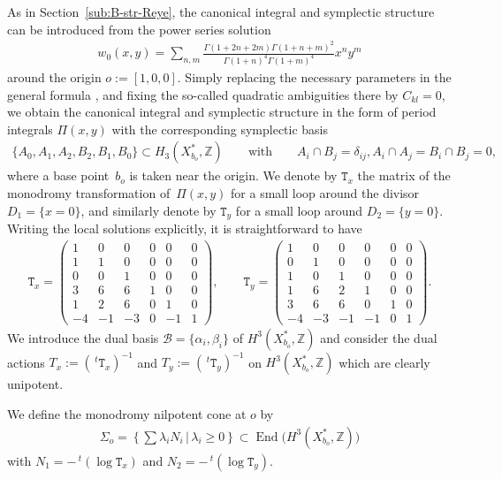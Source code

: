 \documentclass[pdftex]{sigma}
\numberwithin{equation}{section}
\begin{document}
As in Section~\ref{sub:B-str-Reye}, the canonical integral and symplectic structure can be introduced from the power series solution
\begin{gather*}
w_{0}(x,y)=\sum_{n,m}\frac{\Gamma(1+2n+2m)\Gamma(1+n+m)^{2}}{\Gamma(1+n)^{4}\Gamma(1+m)^{4}}x^{n}y^{m}
\end{gather*}
around the origin $o:=[1,0,0]$. Simply replacing the necessary parameters in the general formula \cite[Section~6.3.1]{HTcmp}, and fixing the so-called quadratic ambiguities there by $C_{kl}=0$, we obtain the canonical integral and symplectic structure in the form of period integrals $\Pi(x,y)$ with the corresponding symplectic basis
\begin{gather*}
\{ A_{0},A_{1},A_{2},B_{2},B_{1},B_{0}\} \subset H_{3}(X_{b_{o}}^{*},\mathbb{Z})\qquad \text{with}\qquad A_{i}\cap B_{j}=\delta_{ij},A_{i}\cap A_{j}=B_{i}\cap B_{j}=0,
\end{gather*}
where a base point~$b_{o}$ is taken near the origin. We denote by $\mathtt{T}_{x}$ the matrix of the monodromy transformation of~$\Pi(x,y)$ for a small loop around the divisor $D_{1}= \{ x=0 \} $, and similarly denote by $\mathtt{T}_{y}$ for a small loop around $D_{2}= \{ y=0 \} $. Writing the local solutions explicitly, it is straightforward to have
\begin{gather*}
\mathtt{T}_{x}=\left(\begin{smallmatrix}1 & 0 & 0 & 0 & 0 & 0\\
1 & 1 & 0 & 0 & 0 & 0\\
0 & 0 & 1 & 0 & 0 & 0\\
3 & 6 & 6 & 1 & 0 & 0\\
1 & 2 & 6 & 0 & 1 & 0\\
-4 & -1 & -3 & 0 & -1 & 1
\end{smallmatrix}\right),\qquad \mathtt{T}_{y}=\left(\begin{smallmatrix}1 & 0 & 0 & 0 & 0 & 0\\
0 & 1 & 0 & 0 & 0 & 0\\
1 & 0 & 1 & 0 & 0 & 0\\
1 & 6 & 2 & 1 & 0 & 0\\
3 & 6 & 6 & 0 & 1 & 0\\
-4 & -3 & -1 & -1 & 0 & 1
\end{smallmatrix}\right).
\end{gather*}
We introduce the dual basis $\mathcal{B}= \{ \alpha_{i},\beta_{i} \} $ of $H^{3}(X_{b_{o}}^{*},\mathbb{Z})$ and consider the dual actions $T_{x}:=(\,^{t}\mathtt{T}_{x})^{-1}$ and $T_{y}:=(\,^{t}\mathtt{T}_{y})^{-1}$ on $H^{3}(X_{b_{o}}^{*},\mathbb{Z})$ which are clearly unipotent.
\begin{Definition}
We define the monodromy nilpotent cone at $o$ by
\begin{gather*}
\Sigma_{o}=\left\{ \sum\lambda_{i}N_{i}\,|\,\lambda_{i}\geq0\right\} \subset\operatorname{End}\big(H^{3}(X_{b_{o}}^{*},\mathbb{Z})\big)
\end{gather*}
with $N_{1}=-\,^{t}(\log\mathtt{T}_{x})$ and $N_{2}=-\,^{t}(\log\mathtt{T}_{y})$.
\end{Definition}
\end{document}

